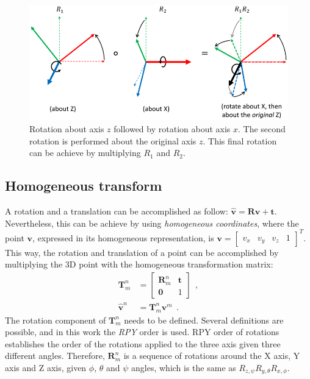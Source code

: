 \begin{figure}
    \centering
    \includegraphics[width=\textwidth]{Images/fig16-rotations.png}
    \caption[Rotation around axis $z$ followed by rotation about axis $x$]{Rotation about axis $z$ followed by rotation about axis $x$. The second rotation is performed about the original axis $z$. This final rotation can be achieve by multiplying $R_1$ and $R_2$.\cite{hauser-robotics-systems}}
    \label{fig:chapter1:transform:rotation_z_x}
\end{figure}

\subsection{Homogeneous transform}
\label{subsec:chapter1:transform:rototranslation}
A rotation and a translation can be accomplished as follow: $\hat{\bm{v}} = \bm{R}\bm{v} + \bm{t}$. Nevertheless, this can be achieve by using \emph{homogeneous coordinates}, where the point $\bm{v}$, expressed in its homogeneous representation, is $\bm{v} = \begin{bmatrix}v_x & v_y & v_z & 1\end{bmatrix}^T$. This way, the rotation and translation of a point can be accomplished by multiplying the 3D point with the homogeneous transformation matrix:
\begin{align}
    \bm{T}_m^n &= \begin{bmatrix}
        \bm{R}_m^n & \bm{t} \\
        \bm{0} & 1
    \end{bmatrix}~~,
    \label{eq:chapter1:transform:homogeneous_transform}\\
    \hat{\bm{v}}^n &= \bm{T}_m^n\bm{v}^m~~.
\end{align}
The rotation component of $\bm{T}_m^n$ needs to be defined. Several definitions are possible, and in this work the \emph{RPY} order is used. RPY order of rotations establishes the order of the rotations applied to the three axis given three different angles. Therefore, $\bm{R}_m^n$ is a sequence of rotations around the X axis, Y axis and Z axis, given $\phi$, $\theta$ and $\psi$ angles, which is the same as $R_{z,\psi}R_{y,\theta}R_{x,\phi}$.\\

